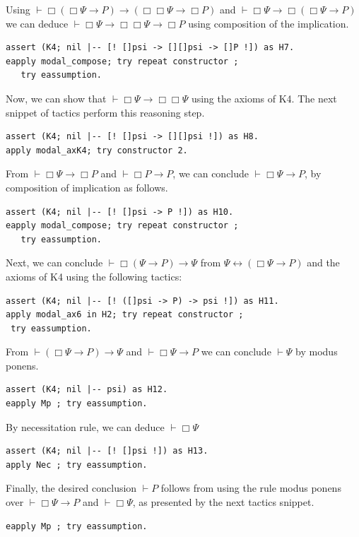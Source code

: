 \documentclass[sigconf]{acmart}
\begin{document}
Using $\vdash \Box (\Box \Psi \to P)\to (\Box \Box \Psi \to \Box P)$ and
$\vdash \Box \Psi \to\Box (\Box \Psi \to P)$ we can deduce
$\vdash \Box \Psi \to \Box \Box \Psi \to \Box P$ using composition of
the implication.
\begin{verbatim}
assert (K4; nil |-- [! []psi -> [][]psi -> []P !]) as H7.
eapply modal_compose; try repeat constructor ;
   try eassumption.
\end{verbatim}

Now, we can show that $\vdash\Box\Psi\to\Box\Box\Psi$ using
the axioms of K4. The next snippet of tactics perform this
reasoning step.
\begin{verbatim}
assert (K4; nil |-- [! []psi -> [][]psi !]) as H8.
apply modal_axK4; try constructor 2.
\end{verbatim}

From $\vdash \Box\Psi \to \Box P$ and $\vdash \Box P \to P$, we can
conclude $\vdash \Box \Psi \to P$, by composition of implication as
follows.
\begin{verbatim}
assert (K4; nil |-- [! []psi -> P !]) as H10.
eapply modal_compose; try repeat constructor ;
   try eassumption.
\end{verbatim}

Next, we can conclude $\vdash \Box (\Psi \to P) \to \Psi$ from
$\Psi \leftrightarrow (\Box \Psi \to P)$ and the axioms of K4 using
the following tactics:
\begin{verbatim}
assert (K4; nil |-- [! ([]psi -> P) -> psi !]) as H11.
apply modal_ax6 in H2; try repeat constructor ;
 try eassumption.
\end{verbatim}

From $\vdash (\Box\Psi \to P) \to \Psi$ and $\vdash \Box \Psi \to P$
we can conclude $\vdash \Psi$ by modus ponens.
\begin{verbatim}
assert (K4; nil |-- psi) as H12.
eapply Mp ; try eassumption.
\end{verbatim}

By necessitation rule, we can deduce $\vdash \Box \Psi$
\begin{verbatim}
assert (K4; nil |-- [! []psi !]) as H13.
apply Nec ; try eassumption.
\end{verbatim}

Finally, the desired conclusion $\vdash P$ follows from
using the rule modus ponens over $\vdash \Box \Psi \to P$
and $\vdash \Box \Psi$, as presented by the next tactics
snippet.
\begin{verbatim}
eapply Mp ; try eassumption.
\end{verbatim}
\end{document}
